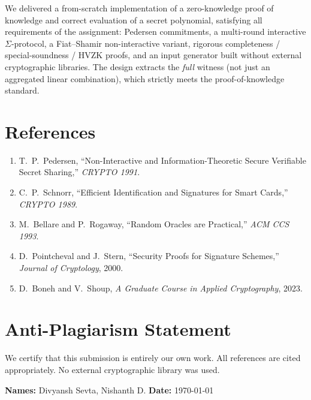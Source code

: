 \documentclass[11pt,a4paper]{article}
\begin{document}
We delivered a from-scratch implementation of a zero-knowledge proof of
knowledge and correct evaluation of a secret polynomial, satisfying all
requirements of the assignment: Pedersen commitments, a multi-round
interactive $\Sigma$-protocol, a Fiat--Shamir non-interactive variant,
rigorous completeness / special-soundness / HVZK proofs, and an input
generator built without external cryptographic libraries. The design
extracts the \emph{full} witness (not just an aggregated linear
combination), which strictly meets the proof-of-knowledge standard.

\section*{References}
\begin{enumerate}
  \item T.~P.~Pedersen, ``Non-Interactive and Information-Theoretic
        Secure Verifiable Secret Sharing,'' \textit{CRYPTO 1991}.
  \item C.~P.~Schnorr, ``Efficient Identification and Signatures for
        Smart Cards,'' \textit{CRYPTO 1989}.
  \item M.~Bellare and P.~Rogaway, ``Random Oracles are Practical,''
        \textit{ACM CCS 1993}.
  \item \label{ps2000} D.~Pointcheval and J.~Stern, ``Security Proofs
        for Signature Schemes,'' \textit{Journal of Cryptology}, 2000.
  \item D.~Boneh and V.~Shoup, \textit{A Graduate Course in Applied
        Cryptography}, 2023.
\end{enumerate}

\section*{Anti-Plagiarism Statement}
We certify that this submission is entirely our own work. All references
are cited appropriately. No external cryptographic library was used.

\vspace{1cm}
\textbf{Names:} Divyansh Sevta, Nishanth D. \qquad \textbf{Date:} \today
\end{document}
